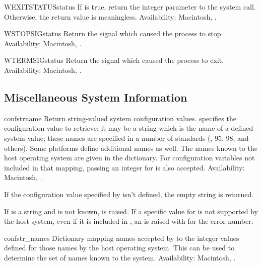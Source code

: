 \begin{funcdesc}{WEXITSTATUS}{status}
If  is true, return the integer
parameter to the  system call.  Otherwise, the return
value is meaningless.
Availability: Macintosh, \UNIX.
\end{funcdesc}

\begin{funcdesc}{WSTOPSIG}{status}
Return the signal which caused the process to stop.
Availability: Macintosh, \UNIX.
\end{funcdesc}

\begin{funcdesc}{WTERMSIG}{status}
Return the signal which caused the process to exit.
Availability: Macintosh, \UNIX.
\end{funcdesc}


\subsection{Miscellaneous System Information \label{os-path}}


\begin{funcdesc}{confstr}{name}
Return string-valued system configuration values.
 specifies the configuration value to retrieve; it may be a
string which is the name of a defined system value; these names are
specified in a number of standards (\POSIX, \UNIX{} 95, \UNIX{} 98, and
others).  Some platforms define additional names as well.  The names
known to the host operating system are given in the
 dictionary.  For configuration variables not
included in that mapping, passing an integer for  is also
accepted.
Availability: Macintosh, \UNIX.

If the configuration value specified by  isn't defined, the
empty string is returned.

If  is a string and is not known,  is
raised.  If a specific value for  is not supported by the
host system, even if it is included in , an
 is raised with  for the
error number.
\end{funcdesc}

\begin{datadesc}{confstr_names}
Dictionary mapping names accepted by  to the
integer values defined for those names by the host operating system.
This can be used to determine the set of names known to the system.
Availability: Macintosh, \UNIX.
\end{datadesc}

